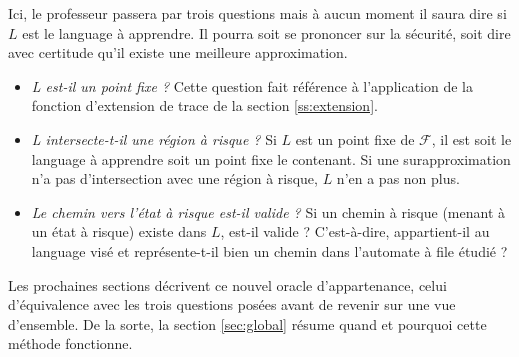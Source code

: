 Ici, le professeur passera par trois questions mais à aucun moment il saura dire si $L$ est le language à apprendre. Il pourra soit se prononcer sur la sécurité, soit dire avec certitude qu'il existe une meilleure approximation.

\begin{itemize}
	\item \emph{L est-il un point fixe ?} Cette question fait référence à l'application de la fonction d'extension de trace de la section \ref{ss:extension}.
	\item \emph{L intersecte-t-il une région à risque ?} Si $L$ est un point fixe de $\mathcal{F}$, il est soit le language à apprendre soit un point fixe le contenant. Si une surapproximation n'a pas d'intersection avec une région à risque, $L$ n'en a pas non plus.
	\item \emph{Le chemin vers l'état à risque est-il valide ?} Si un chemin à risque (menant à un état à risque) existe dans $L$, est-il valide ? C'est-à-dire, appartient-il au language visé et représente-t-il bien un chemin dans l'automate à file étudié ?
\end{itemize}


Les prochaines sections décrivent ce nouvel oracle d'appartenance, celui d'équivalence avec les trois questions posées avant de revenir sur une vue d'ensemble. De la sorte, la section \ref{sec:global} résume quand et pourquoi cette méthode fonctionne.
